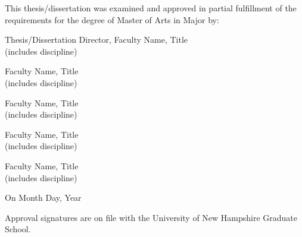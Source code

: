 
\renewcommand{\headrulewidth}{0pt}

\vspace*{1in}

\noindent
{\small This thesis/dissertation was examined and approved in partial fulfillment of the requirements for the degree of Master of Arts in Major by:}
\vspace{0.25in}

\begin{flushright}
\begin{minipage}{4.5in}
\begin{flushleft}
{\small Thesis/Dissertation Director, Faculty Name, Title\\
(includes discipline)}
\vspace{0.1in}

{\small Faculty Name, Title\\
(includes discipline)}
\vspace{0.1in}

{\small Faculty Name, Title\\
(includes discipline)}
\vspace{0.1in}

{\small Faculty Name, Title\\
(includes discipline)}
\vspace{0.1in}

{\small Faculty Name, Title\\
(includes discipline)}
\vspace{0.25in}

{\small On Month Day, Year}
\end{flushleft}
\end{minipage}
\end{flushright}
\vspace{0.25in}

{\small Approval signatures are on file with the University of New Hampshire Graduate School.}

\vspace*{\fill} 
